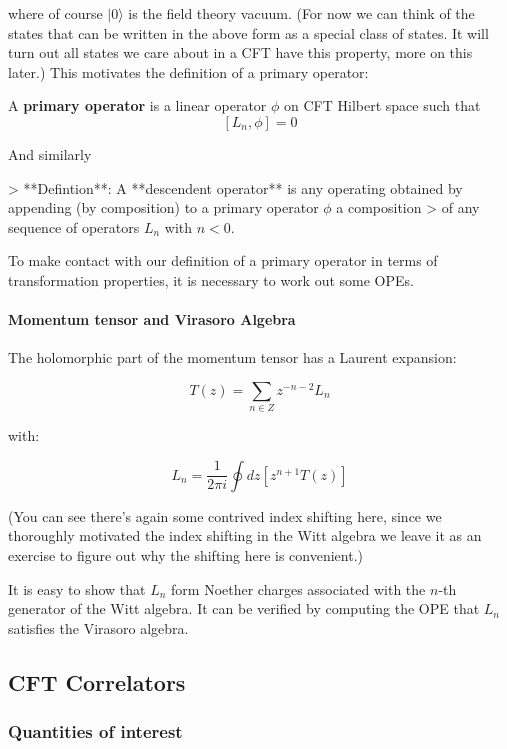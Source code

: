 where of course $|0 \rangle$ is the field theory vacuum. (For now we can think of the states that can be written in the above form as a special class of states. It will turn out all states we care about in a CFT have this property, more on this later.) This motivates the definition of a primary operator:

\begin{defn}
 A \textbf{primary operator} is a linear operator $\phi$ on CFT Hilbert space such that $$[L_n , \phi] = 0$$
\end{defn}
And similarly

> **Defintion**: A **descendent operator** is any operating obtained by appending (by composition) to a primary operator $\phi$ a composition
> of any sequence of operators $L_n$ with $n < 0$.

To make contact with our definition of a primary operator in terms of transformation properties, it is necessary to work out some OPEs.

\paragraph{ Momentum tensor and Virasoro Algebra}

The holomorphic part of the momentum tensor has a Laurent expansion:

$$T(z) = \sum_{n \in Z} z^{-n - 2}L_n$$

with:

$$L_n = \frac 1 {2 \pi i} \oint dz [z^{n+1}T(z)]$$

(You can see there's again some contrived index shifting here, since we thoroughly motivated the index shifting in the Witt algebra we leave it as an exercise to figure out why the shifting here is convenient.)

It is easy to show that $L_n$ form Noether charges associated with the $n$-th generator of the Witt algebra. It can be verified by computing the OPE that $L_n$ satisfies the Virasoro algebra. 



\subsection{ CFT Correlators}

\subsubsection{ Quantities of interest}

